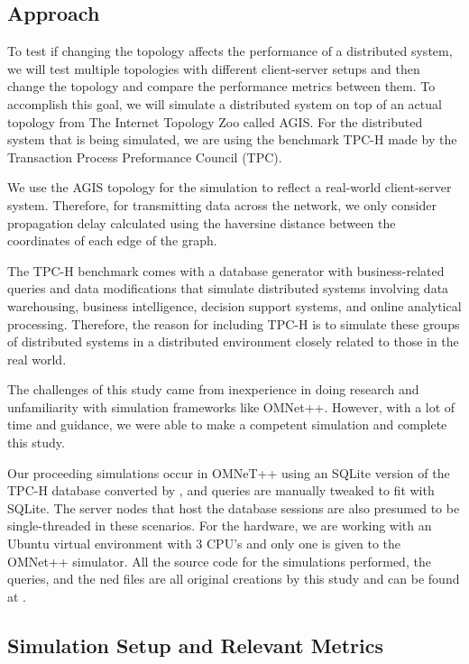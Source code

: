 \subsection{Approach}

To test if changing the topology affects the performance of a distributed system, we will test multiple topologies with different client-server setups and then change the topology and compare the performance metrics between them. To accomplish this goal, we will simulate a distributed system on top of an actual topology from The Internet Topology Zoo called AGIS. For the distributed system that is being simulated, we are using the benchmark TPC-H made by the Transaction Process Preformance Council (TPC).

	We use the AGIS topology for the simulation to reflect a real-world client-server system. Therefore, for transmitting data across the network, we only consider propagation delay calculated using the haversine distance between the coordinates of each edge of the graph.

The TPC-H benchmark comes with a database generator with business-related queries and data modifications that simulate distributed systems involving data warehousing, business intelligence, decision support systems, and online analytical processing. Therefore, the reason for including TPC-H is to simulate these groups of distributed systems in a distributed environment closely related to those in the real world.

	The challenges of this study came from inexperience in doing research and unfamiliarity with simulation frameworks like OMNet++. However, with a lot of time and guidance, we were able to make a competent simulation and complete this study.

	Our proceeding simulations occur in OMNeT++ using an SQLite version of the TPC-H database converted by \cite{lovasoaTPCHsqlite}, and queries are manually tweaked to fit with SQLite. The server nodes that host the database sessions are also presumed to be single-threaded in these scenarios. For the hardware, we are working with an Ubuntu virtual environment with 3 CPU’s and only one is given to the OMNet++ simulator. All the source code for the simulations performed, the queries, and the ned files are all original creations by this study and can be found at \cite{alex21topology}.



\subsection{Simulation Setup and Relevant Metrics}

